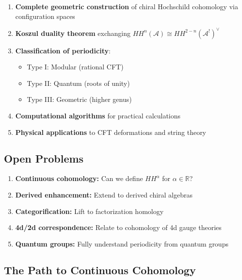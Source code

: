 \begin{enumerate}
\item \textbf{Complete geometric construction} of chiral Hochschild cohomology via configuration spaces

\item \textbf{Koszul duality theorem} exchanging $HH^n(\mathcal{A}) \cong HH^{2-n}(\mathcal{A}^!)^{\vee}$

\item \textbf{Classification of periodicity}:
   \begin{itemize}
   \item Type I: Modular (rational CFT)
   \item Type II: Quantum (roots of unity)
   \item Type III: Geometric (higher genus)
   \end{itemize}

\item \textbf{Computational algorithms} for practical calculations

\item \textbf{Physical applications} to CFT deformations and string theory
\end{enumerate}

\subsection{Open Problems}

\begin{enumerate}
\item \textbf{Continuous cohomology:} Can we define $HH^{\alpha}$ for $\alpha \in \mathbb{R}$?

\item \textbf{Derived enhancement:} Extend to derived chiral algebras

\item \textbf{Categorification:} Lift to factorization homology

\item \textbf{4d/2d correspondence:} Relate to cohomology of 4d gauge theories

\item \textbf{Quantum groups:} Fully understand periodicity from quantum groups
\end{enumerate}

\subsection{The Path to Continuous Cohomology}

